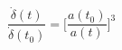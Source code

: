 \begin{equation}\label{firstinterflat}
\frac{\dot{\delta}(t)}{\dot{\delta}(t_0)}=
\bigg[\frac{a(t_0)}{a(t)}\bigg]^3
\end{equation}

